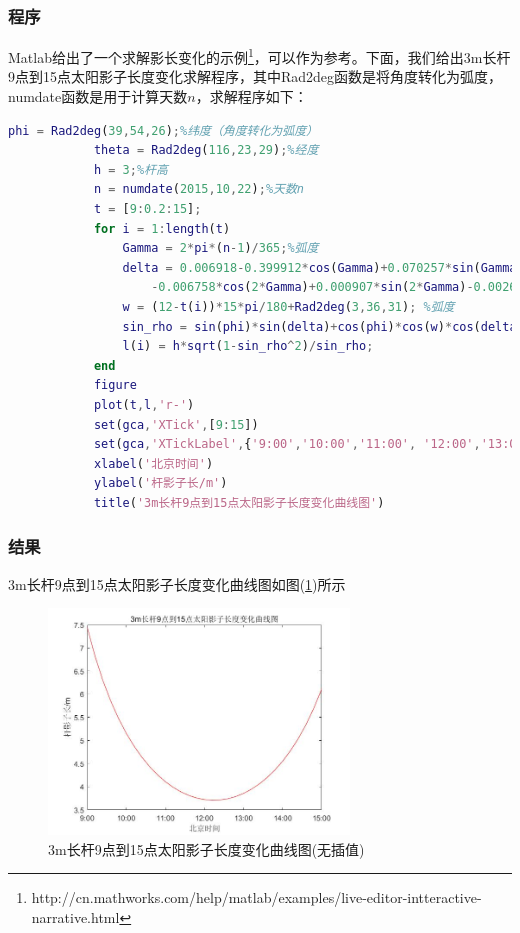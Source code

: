         \subsubsection{程序}
            \par
            Matlab给出了一个求解影长变化的示例\footnote{http://cn.mathworks.com/help/matlab/examples/live-editor-intteractive-narrative.html}，可以作为参考。下面，我们给出3m长杆9点到15点太阳影子长度变化求解程序，其中Rad2deg函数是将角度转化为弧度，numdate函数是用于计算天数$n$，求解程序如下：
            \begin{lstlisting}[language = Matlab]
            phi = Rad2deg(39,54,26);%纬度（角度转化为弧度）
            theta = Rad2deg(116,23,29);%经度
            h = 3;%杆高
            n = numdate(2015,10,22);%天数n
            t = [9:0.2:15];
            for i = 1:length(t)
                Gamma = 2*pi*(n-1)/365;%弧度
                delta = 0.006918-0.399912*cos(Gamma)+0.070257*sin(Gamma)...
                    -0.006758*cos(2*Gamma)+0.000907*sin(2*Gamma)-0.002697*cos(3*Gamma)+0.00148*sin(3*Gamma);%弧度
                w = (12-t(i))*15*pi/180+Rad2deg(3,36,31); %弧度
                sin_rho = sin(phi)*sin(delta)+cos(phi)*cos(w)*cos(delta);
                l(i) = h*sqrt(1-sin_rho^2)/sin_rho;
            end
            figure
            plot(t,l,'r-')
            set(gca,'XTick',[9:15])
            set(gca,'XTickLabel',{'9:00','10:00','11:00', '12:00','13:00','14:00','15:00'})
            xlabel('北京时间')
            ylabel('杆影子长/m')
            title('3m长杆9点到15点太阳影子长度变化曲线图')
            \end{lstlisting}
        \subsubsection{结果}
            \par
            3m长杆9点到15点太阳影子长度变化曲线图如图(\ref{fig:3m长杆9点到15点太阳影子长度变化曲线图(无插值)})所示
			\begin{figure}[H]
			\centering
			\includegraphics[width = 8cm]{images/3m_pole_sun_shadow_length_change1.jpg}
			\caption{3m长杆9点到15点太阳影子长度变化曲线图(无插值)}
			\label{fig:3m长杆9点到15点太阳影子长度变化曲线图(无插值)}
			\end{figure}

